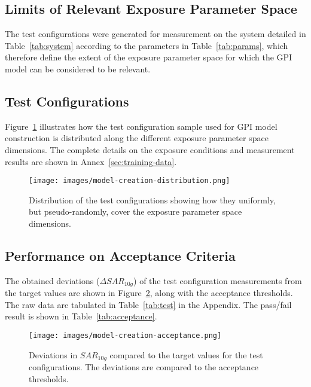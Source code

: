 \documentclass{article}
\begin{document}
\subsection{Limits of Relevant Exposure Parameter Space}
The test configurations were generated for measurement on the system detailed in Table~\ref{tab:system} according to the parameters in Table~\ref{tab:params}, which therefore define the extent of the exposure parameter space for which the GPI model can be considered to be relevant.



\FloatBarrier
\subsection{Test Configurations}

Figure~\ref{fig:training-dist} illustrates how the test configuration sample used for GPI model construction is distributed along the different exposure parameter space dimensions. The complete details on the exposure conditions and measurement results are shown in Annex~\ref{sec:training-data}.

\begin{figure} \centering
\texttt{[image: images/model-creation-distribution.png]}
\caption{Distribution of the test configurations showing how they uniformly, but pseudo-randomly, cover the exposure parameter space dimensions.} \label{fig:training-dist}
\end{figure}

\FloatBarrier
\subsection{Performance on Acceptance Criteria}
The obtained deviations ($\Delta SAR_{10g}$) of the test configuration measurements from the target values are shown in Figure~\ref{fig:creation-acc}, along with the acceptance thresholds. The raw data are tabulated in Table~\ref{tab:test} in the Appendix.
The pass/fail result is shown in Table~\ref{tab:acceptance}.



\begin{figure}[H] \centering
\texttt{[image: images/model-creation-acceptance.png]}
\caption{Deviations in $SAR_{10g}$ compared to the target values for the test configurations. The deviations are compared to the acceptance thresholds.} \label{fig:creation-acc}
\end{figure}
\end{document}
